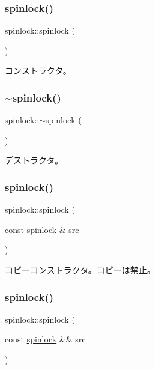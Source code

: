 \subsubsection{\texorpdfstring{spinlock()}{spinlock()}\hspace{0.1cm}{\footnotesize\ttfamily [1/3]}}
{\footnotesize\ttfamily spinlock\+::spinlock (\begin{DoxyParamCaption}{ }\end{DoxyParamCaption})}

コンストラクタ。 \hypertarget{classspinlock_a76cb389d388f3298ac71d72182391d0d}{}\label{classspinlock_a76cb389d388f3298ac71d72182391d0d} 
\subsubsection{\texorpdfstring{$\sim$spinlock()}{~spinlock()}}
{\footnotesize\ttfamily spinlock\+::$\sim$spinlock (\begin{DoxyParamCaption}{ }\end{DoxyParamCaption})\hspace{0.3cm}{\ttfamily [virtual]}}

デストラクタ。 \hypertarget{classspinlock_a26da24b614df2de117fcdd14d5c2d85e}{}\label{classspinlock_a26da24b614df2de117fcdd14d5c2d85e} 
\subsubsection{\texorpdfstring{spinlock()}{spinlock()}\hspace{0.1cm}{\footnotesize\ttfamily [2/3]}}
{\footnotesize\ttfamily spinlock\+::spinlock (\begin{DoxyParamCaption}\item[{const \hyperlink{classspinlock}{spinlock} \&}]{src }\end{DoxyParamCaption})\hspace{0.3cm}{\ttfamily [delete]}}

コピーコンストラクタ。コピーは禁止。 \hypertarget{classspinlock_acadc56246fd003d5baf7ffe8f9b1ed23}{}\label{classspinlock_acadc56246fd003d5baf7ffe8f9b1ed23} 
\subsubsection{\texorpdfstring{spinlock()}{spinlock()}\hspace{0.1cm}{\footnotesize\ttfamily [3/3]}}
{\footnotesize\ttfamily spinlock\+::spinlock (\begin{DoxyParamCaption}\item[{const \hyperlink{classspinlock}{spinlock} \&\&}]{src }\end{DoxyParamCaption})\hspace{0.3cm}{\ttfamily [delete]}}

